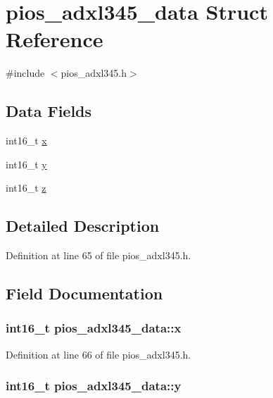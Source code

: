 \hypertarget{structpios__adxl345__data}{\section{pios\-\_\-adxl345\-\_\-data \-Struct \-Reference}
\label{structpios__adxl345__data}
}


{\ttfamily \#include $<$pios\-\_\-adxl345.\-h$>$}

\subsection*{\-Data \-Fields}
\begin{DoxyCompactItemize}
\item 
int16\-\_\-t \hyperlink{structpios__adxl345__data_ab1338ff20e167a7a38475401bc16616e}{x}
\item 
int16\-\_\-t \hyperlink{structpios__adxl345__data_a442839a6ffa895262a2a0924e6a5066a}{y}
\item 
int16\-\_\-t \hyperlink{structpios__adxl345__data_a5d428741b731802a2974ef2598fe1a4c}{z}
\end{DoxyCompactItemize}


\subsection{\-Detailed \-Description}


\-Definition at line 65 of file pios\-\_\-adxl345.\-h.



\subsection{\-Field \-Documentation}
\hypertarget{structpios__adxl345__data_ab1338ff20e167a7a38475401bc16616e}{
\subsubsection[{x}]{\setlength{\rightskip}{0pt plus 5cm}int16\-\_\-t {\bf pios\-\_\-adxl345\-\_\-data\-::x}}}\label{structpios__adxl345__data_ab1338ff20e167a7a38475401bc16616e}


\-Definition at line 66 of file pios\-\_\-adxl345.\-h.

\hypertarget{structpios__adxl345__data_a442839a6ffa895262a2a0924e6a5066a}{
\subsubsection[{y}]{\setlength{\rightskip}{0pt plus 5cm}int16\-\_\-t {\bf pios\-\_\-adxl345\-\_\-data\-::y}}}\label{structpios__adxl345__data_a442839a6ffa895262a2a0924e6a5066a}


